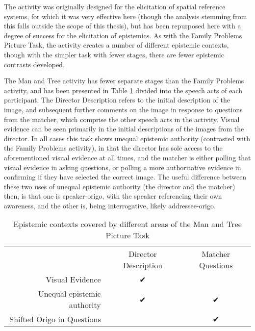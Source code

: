 The activity was originally designed for the elicitation of spatial reference systems, for which it was very effective here (though the analysis stemming from this falls outside the scope of this thesis), but has been repurposed here with a degree of success for the elicitation of epistemics. As with the Family Problems Picture Task, the activity creates a number of different epistemic contexts, though with the simpler task with fewer stages, there are fewer epistemic contrasts developed.

The Man and Tree activity has fewer separate stages than the Family Problems activity, and has been presented in Table \ref{t:Methods:ManTreeEvidentials} divided into the speech acts of each participant. The Director Description refers to the initial description of the image, and subsequent further comments on the image in response to questions from the matcher, which comprise the other speech acts in the activity. Visual evidence can be seen primarily in the initial descriptions of the images from the director. In all cases this task shows unequal epistemic authority (contrasted with the Family Problems activity), in that the director has sole access to the aforementioned visual evidence at all times, and the matcher is either polling that visual evidence in asking questions, or polling a more authoritative evidence in confirming if they have selected the correct image. The useful difference between these two uses of unequal epistemic authority (the director and the matcher) then, is that one is speaker-origo, with the speaker referencing their own awareness, and the other is, being interrogative, likely addressee-origo.

\begin{table}
       \centering
       \caption{Epistemic contexts covered by different areas of the Man and Tree Picture Task}\label{t:Methods:ManTreeEvidentials}
       \begin{tabular}{r|c|c}
                                          & Director Description & Matcher Questions \\
              Visual Evidence             & ✔                    &                   \\
              Unequal epistemic authority & ✔                    & ✔                 \\
              Shifted Origo in Questions  &                      & ✔
       \end{tabular}
       
\end{table}

